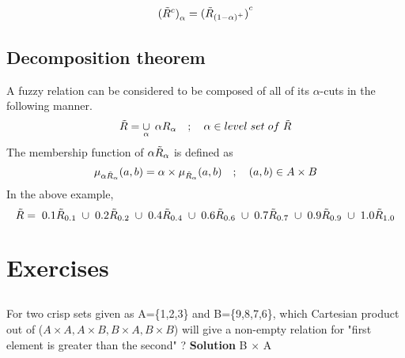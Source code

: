 \documentclass{article}
\begin{document}
{\subsubsection{}
\[{(\Tilde{R}^c)}_\alpha = {(\Tilde{R}_{{(1-\alpha)}^+})}^c \]
\subsection{Decomposition theorem}
A fuzzy relation can be considered to be composed of all of its $\alpha$-cuts in the following manner.
\[\Tilde{R}=\mathop{\cup}_{\alpha}\hspace{0.1cm}\alpha R_\alpha\quad;\quad \alpha\in level\hspace{0.1cm}set\hspace{0.1cm}of\hspace{0.1cm}\Tilde{R}\]
The membership function of $\alpha\Tilde{R}_\alpha$ is defined as 
\[\mu_{\alpha\Tilde{R}_\alpha}(a,b)=\alpha\times\mu_{\Tilde{R}_\alpha}(a,b)\quad;\quad(a,b)\in A\times B\]
In the above example,
\[\Tilde{R}=\hspace{0.1cm}0.1\Tilde{R}_{0.1}\hspace{0.1cm} \cup \hspace{0.1cm}0.2\Tilde{R}_{0.2} \hspace{0.1cm}\cup\hspace{0.1cm} 0.4\Tilde{R}_{0.4} \hspace{0.1cm}\cup \hspace{0.1cm}0.6\Tilde{R}_{0.6} \hspace{0.1cm}\cup \hspace{0.1cm}0.7\Tilde{R}_{0.7} \hspace{0.1cm}\cup \hspace{0.1cm}0.9\Tilde{R}_{0.9}\hspace{0.1cm} \cup \hspace{0.1cm}1.0\Tilde{R}_{1.0}\]
\section{Exercises}
\subsection{}
For two crisp sets given as  A=\{{1,2,3}\} and B=\{{9,8,7,6}\}, which Cartesian product out of ($ A\times A ,A\times B,B\times A ,B\times B$)  will give a non-empty relation for "first element is greater than the second" ?
\newline\textbf{Solution}\newline
B $\times$ A
}
\end{document}
